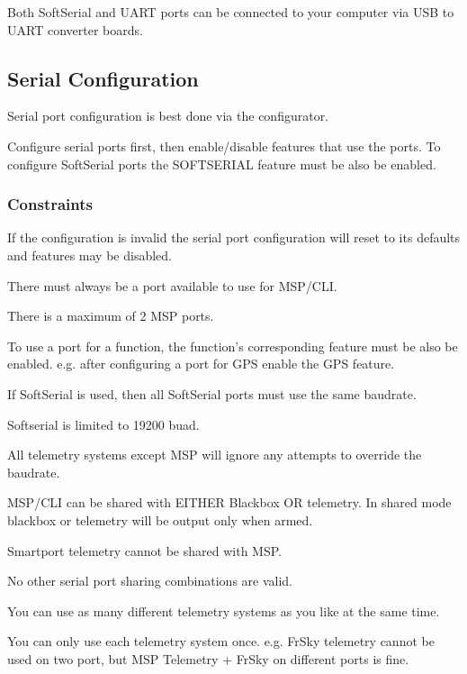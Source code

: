 Both Soft\+Serial and U\+A\+R\+T ports can be connected to your computer via U\+S\+B to U\+A\+R\+T converter boards.

\subsection*{Serial Configuration}

Serial port configuration is best done via the configurator.

Configure serial ports first, then enable/disable features that use the ports. To configure Soft\+Serial ports the S\+O\+F\+T\+S\+E\+R\+I\+A\+L feature must be also be enabled.

\subsubsection*{Constraints}

If the configuration is invalid the serial port configuration will reset to its defaults and features may be disabled.


\begin{DoxyItemize}
\item There must always be a port available to use for M\+S\+P/\+C\+L\+I.
\item There is a maximum of 2 M\+S\+P ports.
\item To use a port for a function, the function's corresponding feature must be also be enabled. e.\+g. after configuring a port for G\+P\+S enable the G\+P\+S feature.
\item If Soft\+Serial is used, then all Soft\+Serial ports must use the same baudrate.
\item Softserial is limited to 19200 buad.
\item All telemetry systems except M\+S\+P will ignore any attempts to override the baudrate.
\item M\+S\+P/\+C\+L\+I can be shared with E\+I\+T\+H\+E\+R Blackbox O\+R telemetry. In shared mode blackbox or telemetry will be output only when armed.
\item Smartport telemetry cannot be shared with M\+S\+P.
\item No other serial port sharing combinations are valid.
\item You can use as many different telemetry systems as you like at the same time.
\item You can only use each telemetry system once. e.\+g. Fr\+Sky telemetry cannot be used on two port, but M\+S\+P Telemetry + Fr\+Sky on different ports is fine.
\end{DoxyItemize}

